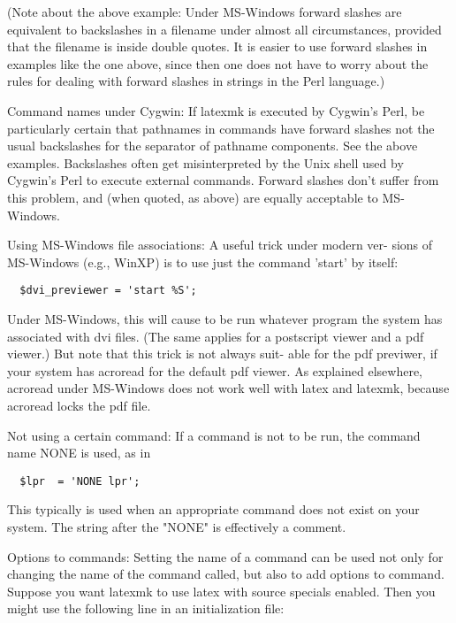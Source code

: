 (Note  about  the  above  example: Under MS-Windows forward slashes are
equivalent to backslashes in a filename under almost all circumstances,
provided  that  the  filename is inside double quotes.  It is easier to
use forward slashes in examples like the one above, since then one does
not  have  to worry about the rules for dealing with forward slashes in
strings in the Perl language.)

Command names under Cygwin: If latexmk is executed  by  Cygwin's  Perl,
be particularly certain that pathnames in commands have forward slashes
not the usual backslashes for the  separator  of  pathname  components.
See  the  above  examples.  Backslashes often get misinterpreted by the
Unix shell used by Cygwin's Perl to execute external commands.  Forward
slashes don't suffer from this problem, and (when quoted, as above) are
equally acceptable to MS-Windows.

Using MS-Windows file associations: A useful trick  under  modern  ver-
sions of MS-Windows (e.g., WinXP) is to use just the command 'start' by
itself:

\begin{verbatim}
  $dvi_previewer = 'start %S';
\end{verbatim}

Under MS-Windows, this will cause to be run whatever program the system
has  associated  with  dvi  files.   (The same applies for a postscript
viewer and a pdf viewer.)  But note that this trick is not always suit-
able  for the pdf previwer, if your system has acroread for the default
pdf viewer.  As explained elsewhere, acroread under MS-Windows does not
work well with latex and latexmk, because acroread locks the pdf file.

Not using a certain command: If a command is not to be run, the command
name NONE is used, as in

\begin{verbatim}
  $lpr  = 'NONE lpr';
\end{verbatim}

This typically is used when an appropriate command does  not  exist  on
your system.  The string after the "NONE" is effectively a comment.

Options to commands: Setting the name of a command can be used not only
for changing the name of the command called, but also to add options to
command.   Suppose  you  want latexmk to use latex with source specials
enabled.  Then you might use the following line  in  an  initialization
file:


